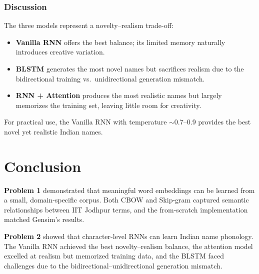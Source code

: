 \documentclass[11pt,a4paper]{article}
\begin{document}
\subsubsection{Discussion}

The three models represent a novelty--realism trade-off:
\begin{itemize}
    \item \textbf{Vanilla RNN} offers the best balance; its limited memory naturally introduces creative variation.
    \item \textbf{BLSTM} generates the most novel names but sacrifices realism due to the bidirectional training vs.\ unidirectional generation mismatch.
    \item \textbf{RNN + Attention} produces the most realistic names but largely memorizes the training set, leaving little room for creativity.
\end{itemize}
For practical use, the Vanilla RNN with temperature $\sim$0.7--0.9 provides the best novel yet realistic Indian names.

\section{Conclusion}

\textbf{Problem 1} demonstrated that meaningful word embeddings can be learned from a small, domain-specific corpus. Both CBOW and Skip-gram captured semantic relationships between IIT Jodhpur terms, and the from-scratch implementation matched Gensim's results.

\textbf{Problem 2} showed that character-level RNNs can learn Indian name phonology. The Vanilla RNN achieved the best novelty--realism balance, the attention model excelled at realism but memorized training data, and the BLSTM faced challenges due to the bidirectional--unidirectional generation mismatch.
\end{document}
